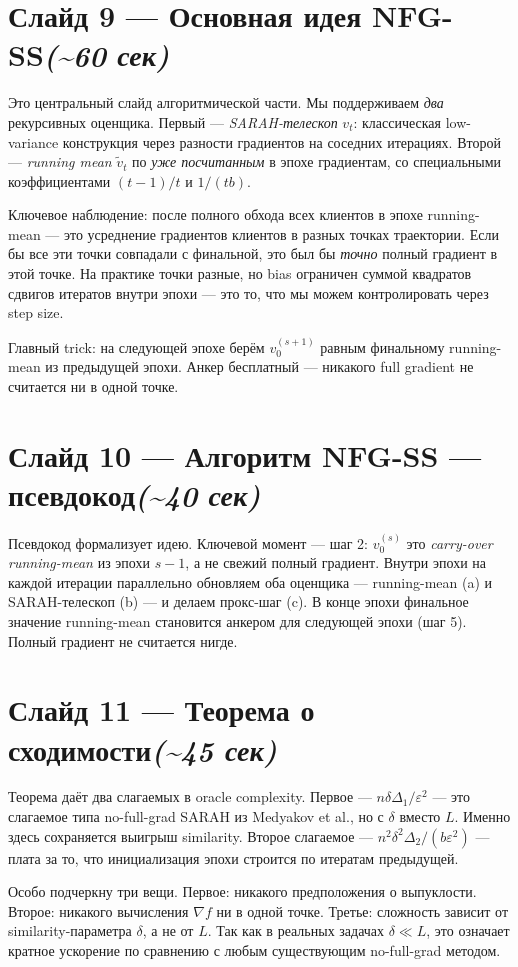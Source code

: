 \documentclass[11pt,a4paper]{article}
\newcommand{\slide}[3]{%
  \section*{Слайд #1 — #2\hfill\normalsize\color{lighttext}\textit{(\textasciitilde #3)}}%
}
\begin{document}
\slide{9}{Основная идея NFG-SS}{60 сек}

Это центральный слайд алгоритмической части. Мы поддерживаем \emph{два} рекурсивных оценщика. Первый — \emph{SARAH-телескоп} $v_t$: классическая low-variance конструкция через разности градиентов на соседних итерациях. Второй — \emph{running mean} $\tilde v_t$ по \emph{уже посчитанным} в эпохе градиентам, со специальными коэффициентами $(t-1)/t$ и $1/(tb)$.

Ключевое наблюдение: после полного обхода всех клиентов в эпохе running-mean — это усреднение градиентов клиентов в разных точках траектории. Если бы все эти точки совпадали с финальной, это был бы \emph{точно} полный градиент в этой точке. На практике точки разные, но bias ограничен суммой квадратов сдвигов итератов внутри эпохи — это то, что мы можем контролировать через step size.

Главный trick: на следующей эпохе берём $v_0^{(s+1)}$ равным финальному running-mean из предыдущей эпохи. Анкер бесплатный — никакого full gradient не считается ни в одной точке.

\slide{10}{Алгоритм NFG-SS — псевдокод}{40 сек}

Псевдокод формализует идею. Ключевой момент — шаг 2: $v_0^{(s)}$ это \emph{carry-over running-mean} из эпохи $s-1$, а не свежий полный градиент. Внутри эпохи на каждой итерации параллельно обновляем оба оценщика — running-mean (a) и SARAH-телескоп (b) — и делаем прокс-шаг (c). В конце эпохи финальное значение running-mean становится анкером для следующей эпохи (шаг 5). Полный градиент не считается нигде.

\slide{11}{Теорема о сходимости}{45 сек}

Теорема даёт два слагаемых в oracle complexity. Первое — $n \delta \Delta_1 / \varepsilon^2$ — это слагаемое типа no-full-grad SARAH из Medyakov et al., но с $\delta$ вместо $L$. Именно здесь сохраняется выигрыш similarity. Второе слагаемое — $n^2 \delta^2 \Delta_2 / (b \varepsilon^2)$ — плата за то, что инициализация эпохи строится по итератам предыдущей.

Особо подчеркну три вещи. Первое: никакого предположения о выпуклости. Второе: никакого вычисления $\nabla f$ ни в одной точке. Третье: сложность зависит от similarity-параметра $\delta$, а не от $L$. Так как в реальных задачах $\delta \ll L$, это означает кратное ускорение по сравнению с любым существующим no-full-grad методом.
\end{document}
